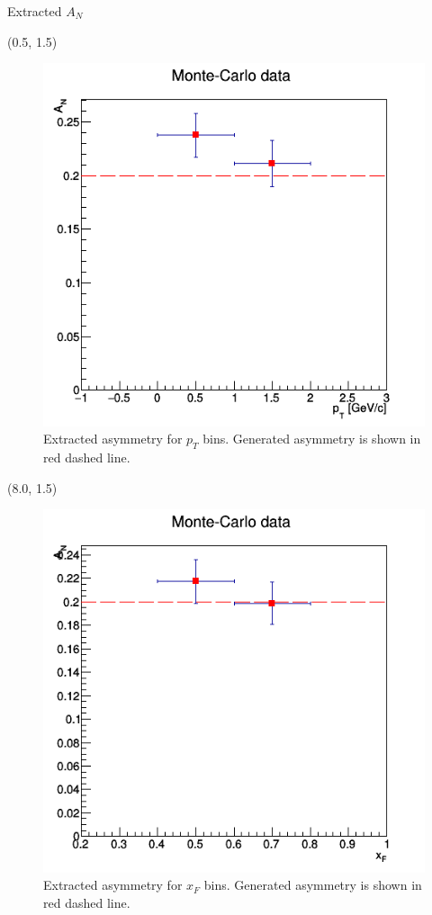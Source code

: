 \documentclass[10pt, xcolor={dvipsnames}, aspectratio = 169]{beamer}
\begin{document}
\begin{frame}{Extracted $A_{N}$}

\begin{textblock}{7.0}(0.5, 1.5)
\begin{figure}
    \centering
    \includegraphics[width = 1.0\linewidth]{imgs/final_asym_pt.png}
    \caption{Extracted asymmetry for $p_{T}$ bins. Generated asymmetry is shown in red dashed line.}
\end{figure}
\end{textblock}

\begin{textblock}{7.0}(8.0, 1.5)
\begin{figure}
    \centering
    \includegraphics[width = 1.0\linewidth]{imgs/final_asym_xf.png}
    \caption{Extracted asymmetry for $x_{F}$ bins. Generated asymmetry is shown in red dashed line.}
\end{figure}
\end{textblock}


\end{frame}
\end{document}
